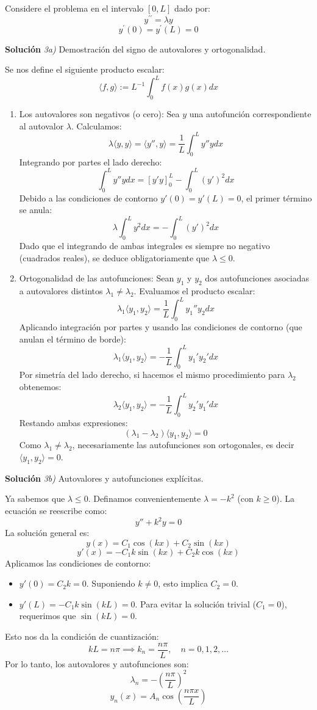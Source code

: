 \documentclass[11pt,spanish]{article}
\newcounter{problema}
\begin{document}
Considere el problema en el intervalo $[0, L]$ dado por:
$$y^{\prime\prime}=\lambda y$$
$$y^{\prime}(0)=y^{\prime}(L)=0$$

\vspace{0.5cm}
{\bf Soluci\'on }{\em 3a)}
Demostración del signo de autovalores y ortogonalidad.
\vspace{0.5cm}

Se nos define el siguiente producto escalar:
$$\langle f,g\rangle:=L^{-1}\int_{0}^{L}f(x)g(x)dx$$
\begin{enumerate}
\item Los autovalores son negativos (o cero):
Sea $y$ una autofunción correspondiente al autovalor $\lambda$. Calculamos:
$$\lambda \langle y, y \rangle = \langle y'', y \rangle = \frac{1}{L} \int_0^L y'' y dx$$
Integrando por partes el lado derecho:
$$\int_0^L y'' y dx = \left[ y' y \right]_0^L - \int_0^L (y')^2 dx$$
Debido a las condiciones de contorno $y'(0)=y'(L)=0$, el primer término se anula:
$$\lambda \int_0^L y^2 dx = - \int_0^L (y')^2 dx$$
Dado que el integrando de ambas integrales es siempre no negativo (cuadrados reales), se deduce obligatoriamente que $\lambda \le 0$.

\item Ortogonalidad de las autofunciones:
Sean $y_1$ y $y_2$ dos autofunciones asociadas a autovalores distintos $\lambda_1 \neq \lambda_2$.
Evaluamos el producto escalar:
$$\lambda_1 \langle y_1, y_2 \rangle = \frac{1}{L} \int_0^L y_1'' y_2 dx$$
Aplicando integración por partes y usando las condiciones de contorno (que anulan el término de borde):
$$\lambda_1 \langle y_1, y_2 \rangle = -\frac{1}{L} \int_0^L y_1' y_2' dx$$
Por simetría del lado derecho, si hacemos el mismo procedimiento para $\lambda_2$ obtenemos:
$$\lambda_2 \langle y_1, y_2 \rangle = -\frac{1}{L} \int_0^L y_2' y_1' dx$$
Restando ambas expresiones:
$$(\lambda_1 - \lambda_2)\langle y_1, y_2 \rangle = 0$$
Como $\lambda_1 \neq \lambda_2$, necesariamente las autofunciones son ortogonales, es decir $\langle y_1, y_2 \rangle = 0$.
\end{enumerate}

\vspace{0.5cm}
{\bf Soluci\'on }{\em 3b)}
Autovalores y autofunciones explícitas.
\vspace{0.5cm}

Ya sabemos que $\lambda \le 0$. Definamos convenientemente $\lambda = -k^2$ (con $k \ge 0$). La ecuación se reescribe como:
$$y'' + k^2 y = 0$$
La solución general es:
$$y(x) = C_1 \cos(kx) + C_2 \sin(kx)$$
$$y'(x) = -C_1 k \sin(kx) + C_2 k \cos(kx)$$
Aplicamos las condiciones de contorno:
\begin{itemize}
\item $y'(0) = C_2 k = 0$. Suponiendo $k \neq 0$, esto implica $C_2 = 0$.
\item $y'(L) = -C_1 k \sin(kL) = 0$. Para evitar la solución trivial ($C_1 = 0$), requerimos que $\sin(kL) = 0$.
\end{itemize}
Esto nos da la condición de cuantización:
$$kL = n\pi \implies k_n = \frac{n\pi}{L}, \quad n=0, 1, 2, \dots$$
Por lo tanto, los autovalores y autofunciones son:
$$\lambda_n = -\left(\frac{n\pi}{L}\right)^2$$
$$y_n(x) = A_n \cos\left(\frac{n\pi x}{L}\right)$$
\end{document}
